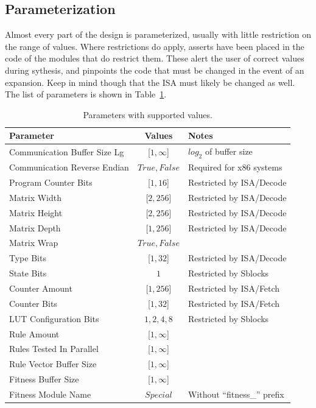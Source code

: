 \subsection{Parameterization}

Almost every part of the design is parameterized, usually with little restriction on the range of values.
Where restrictions do apply, asserts have been placed in the code of the modules that do restrict them.
These alert the user of correct values during sythesis, and pinpoints the code that must be changed in the event of an expansion.
Keep in mind though that the ISA must likely be changed as well.
The list of parameters is shown in Table~\ref{tab:parameters}.

\begin{table}[!ht]
    \renewcommand{\arraystretch}{1.3}
    \centering
    \begin{tabular}{l|c|l}
        \bfseries Parameter & \bfseries Values & \bfseries Notes \\
        \hline
        Communication Buffer Size Lg & [$1,\infty$] & $log_2$ of buffer size \\
        Communication Reverse Endian & $True,False$ & Required for x86 systems \\
        Program Counter Bits         & [$1,16$]     & Restricted by ISA/Decode \\
        Matrix Width                 & [$2,256$]    & Restricted by ISA/Decode \\
        Matrix Height                & [$2,256$]    & Restricted by ISA/Decode \\
        Matrix Depth                 & [$1,256$]    & Restricted by ISA/Decode \\
        Matrix Wrap                  & $True,False$ & \\
        Type Bits                    & [$1,32$]     & Restricted by ISA/Decode \\
        State Bits                   & $1$          & Restricted by Sblocks \\
        Counter Amount               & [$1,256$]    & Restricted by ISA/Fetch \\
        Counter Bits                 & [$1,32$]     & Restricted by ISA/Fetch \\
        LUT Configuration Bits       & $1,2,4,8$    & Restricted by Sblocks \\
        Rule Amount                  & [$1,\infty$] & \\
        Rules Tested In Parallel     & [$1,\infty$] & \\
        Rule Vector Buffer Size      & [$1,\infty$] & \\
        Fitness Buffer Size          & [$1,\infty$] & \\
        Fitness Module Name          & $Special$    & Without ``fitness\_'' prefix \\
    \end{tabular}
    \caption[Parameters.]{Parameters with supported values.}
    \label{tab:parameters}
\end{table}

